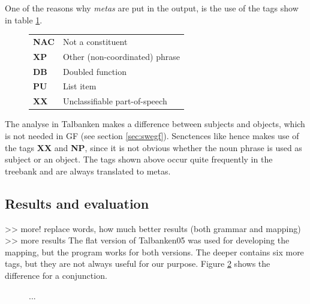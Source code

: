 \documentclass{report}
\begin{document}
One of the reasons why \textit{metas} are put in the output, is the 
use of the tags show in table \ref{fig:mapBadtag}.
\begin{figure}[h]
\begin{tabular}{ll}
\textbf{NAC} & Not a constituent\\
\textbf{XP} & Other (non-coordinated) phrase\\
\textbf{DB} & Doubled function\\
\textbf{PU} & List item\\
\textbf{XX} & Unclassifiable part-of-speech\\
\end{tabular}
\caption{}\label{fig:mapBadtag}
\end{figure}
The analyse in Talbanken makes a difference between subjects
and objects, which is not needed in GF (see section \ref{sec:swegf}).
Senctences like
hence makes use of the tags \textbf{XX} and \textbf{NP}, since it is not obvious whether
the noun phrase is used as subject or an object.
The tags shown above occur quite frequently in the treebank and are always translated
to metas. 

\subsection{Results and evaluation}
>> more! replace words, how much better results (both grammar and mapping) 
>> more results
The flat version of Talbanken05 was used for developing the mapping, but
the program works for both versions.
The deeper contains six more tags, but they are not always useful for our       
purpose. Figure \ref{fig:mappDeepFlat} shows the difference for a conjunction.
\begin{figure}[h]
\centering
{}
\caption{...}
\label{fig:mappDeepFlat}
\end{figure}
\end{document}

